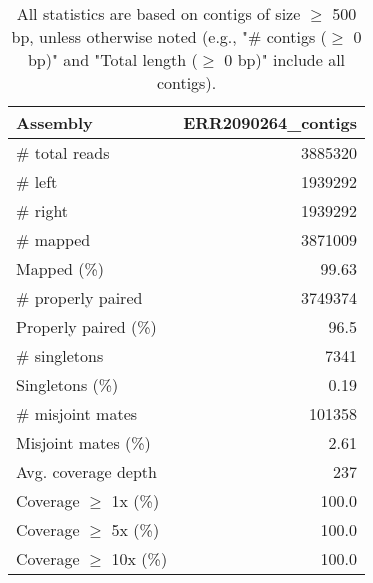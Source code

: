 \documentclass[12pt,a4paper]{article}
\begin{document}
\begin{table}[ht]
\begin{center}
\caption{All statistics are based on contigs of size $\geq$ 500 bp, unless otherwise noted (e.g., "\# contigs ($\geq$ 0 bp)" and "Total length ($\geq$ 0 bp)" include all contigs).}
\begin{tabular}{|l*{1}{|r}|}
\hline
Assembly & ERR2090264\_contigs \\ \hline
\# total reads & 3885320 \\ \hline
\# left & 1939292 \\ \hline
\# right & 1939292 \\ \hline
\# mapped & 3871009 \\ \hline
Mapped (\%) & 99.63 \\ \hline
\# properly paired & 3749374 \\ \hline
Properly paired (\%) & 96.5 \\ \hline
\# singletons & 7341 \\ \hline
Singletons (\%) & 0.19 \\ \hline
\# misjoint mates & 101358 \\ \hline
Misjoint mates (\%) & 2.61 \\ \hline
Avg. coverage depth & 237 \\ \hline
Coverage $\geq$ 1x (\%) & 100.0 \\ \hline
Coverage $\geq$ 5x (\%) & 100.0 \\ \hline
Coverage $\geq$ 10x (\%) & 100.0 \\ \hline
\end{tabular}
\end{center}
\end{table}
\end{document}
